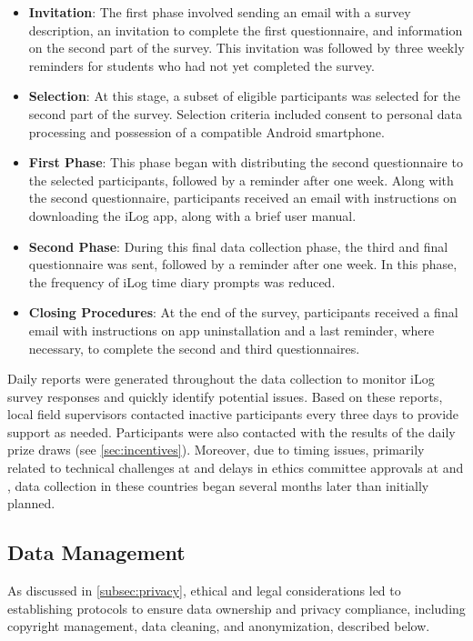 \begin{itemize}    
    \item \textbf{Invitation}: The first phase involved sending an email with a survey description, an invitation to complete the first questionnaire, and information on the second part of the survey. This invitation was followed by three weekly reminders for students who had not yet completed the survey. 
    \item \textbf{Selection}: At this stage, a subset of eligible participants was selected for the second part of the survey. Selection criteria included consent to personal data processing and possession of a compatible Android smartphone.
    \item \textbf{First Phase}: This phase began with distributing the second questionnaire to the selected participants, followed by a reminder after one week. Along with the second questionnaire, participants received an email with instructions on downloading the iLog app, along with a brief user manual.
    \item \textbf{Second Phase}: During this final data collection phase, the third and final questionnaire was sent, followed by a reminder after one week. In this phase, the frequency of iLog time diary prompts was reduced.
    \item \textbf{Closing Procedures}: At the end of the survey, participants received a final email with instructions on app uninstallation and a last reminder, where necessary, to complete the second and third questionnaires.
\end{itemize}
\noindent
Daily reports were generated throughout the data collection to monitor iLog survey responses and quickly identify potential issues. Based on these reports, local field supervisors contacted inactive participants every three days to provide support as needed. Participants were also contacted with the results of the daily prize draws (see \cref{sec:incentives}). Moreover, due to timing issues, primarily related to technical challenges at \JLU and delays in ethics committee approvals at \AMRITA and \IPICYT, data collection in these countries began several months later than initially planned. 

\subsection{Data Management} \label{subsec:management}

As discussed in \cref{subsec:privacy}, ethical and legal considerations led to establishing protocols to ensure data ownership and privacy compliance, including copyright management, data cleaning, and anonymization, described below.

